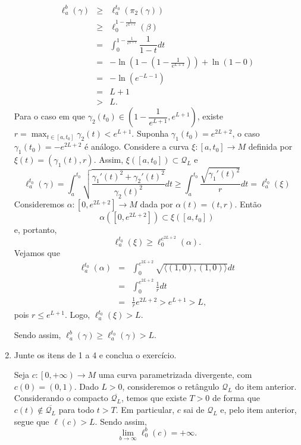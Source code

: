 \documentclass[twoside,openright,titlepage,numbers=noenddot,headinclude,  lineheaders footinclude=true,cleardoublepage=empty,BCOR=5mm,paper=a4,fontsize=12pt ]{scrbook}
\newcommand{\oo}{_}
\begin{document}
\begin{enumerate}
    \[
        \begin{array}{rcl}
            \ell \oo a ^b (\gamma ) 
            &\geq & \ell  \oo a ^{t \oo 0}(\pi\oo 2(\gamma))\\
            &\geq &\ell  \oo 0 ^{1-\frac{1}{e^{L+1}}} ( \beta ) \\
            &=&     \displaystyle\int \oo 0 ^{1-\frac{1}{e^{L+1}}} \dfrac{1}{1-t}dt \\
            &=& -\ln \left(1-\left({1-\frac{1}{e^{L+1}}}\right)\right) + \ln (1-0)\\
            &=&  -\ln (e^{-L-1})  \\
            &=&L+1\\
            &>& L.
        \end{array}
    \]
    Para o caso em que $ \gamma \oo 2 (t \oo 0) \in \left(1 - \dfrac{1}{e^{L+1}}, e^{L+1} \right)$, existe $\displaystyle r = \max \oo {t \in [a, t \oo 0]} \gamma \oo 2 (t)   < e^{L+1}$. 
    Suponha $\gamma \oo 1 (t \oo 0)  = e^{2L+2}$, o caso $\gamma \oo 1 (t \oo 0)  = -e^{2L+2} $ é análogo.
    Considere a curva $ \xi :[a,t \oo 0]\rightarrow M$ definida por $\xi (t) = (\gamma \oo 1 (t), r)$.
    Assim, $\xi ([a,t \oo 0]) \subset \mathcal{Q}\oo L$ e 
    \[
        \ell \oo a ^{t \oo 0 } (\gamma) =\int_a^{t \oo 0} \sqrt{\frac{\gamma_1'(t)^2 + \gamma_2'(t)^2}{\gamma_2(t)^2}} dt
        \geq 
        \int_a^{t \oo 0} \frac{\sqrt{\gamma_1'(t)^2}}{r} dt
        = \ell \oo a^{t \oo 0} (\xi)
    \]
    Consideremos $\alpha : [0, e^{2L + 2}] \rightarrow M$ dada por $\alpha (t) = (t, r)$. 
    Então $$ \alpha ([0, e^{2L + 2}]) \subset \xi ([a, t_0]) $$ e, portanto, $$ \ell _a^{t \oo 0} (\xi) \geq \ell _0 ^{e ^{2L + 2}} (\alpha) .$$
    Vejamos que $$\begin{array}{ccl} 
    \ell _a ^{t \oo 0} (\alpha) & = & \displaystyle \int _0 ^{e^{2L + 2}} \sqrt{\langle (1, 0), (1, 0) \rangle} dt \\
    & = & \displaystyle \int _0 ^{e^{2L + 2}} \frac{1}{r} dt \\ 
    & = & \frac{1}{r} e^{2L + 2} > e^{L + 1} > L,
    \end{array}$$
    pois $r \leq e^{L + 1}$.
    Logo, $\ell _a^{t \oo 0} (\xi) > L$.
    
    Sendo assim, $\ell _a^b (\gamma) \geq \ell _a^{t_0} (\gamma) > L$.




\item Junte os itens de 1 a 4 e  conclua o exercício.

Seja $c : \left[ 0, +\infty \right ) \longrightarrow M$ uma curva parametrizada divergente, com $c (0) = (0, 1)$. 
Dado $L > 0$, consideremos o retângulo $\mathcal{Q}_L$ do item anterior.
Considerando o compacto $\overline{\mathcal{Q}_L}$, temos que existe $T > 0$ de forma que $c(t) \notin \overline{\mathcal{Q}_L}$ para todo $t > T$.
Em particular, $c$ sai de $\mathcal{Q}_L$ e, pelo item anterior, segue que $\ell (c) > L$.
Sendo assim, $$ \displaystyle \lim _{b \rightarrow \infty} \ell _0^b (c) = + \infty .$$
\end{enumerate}
\end{document}
